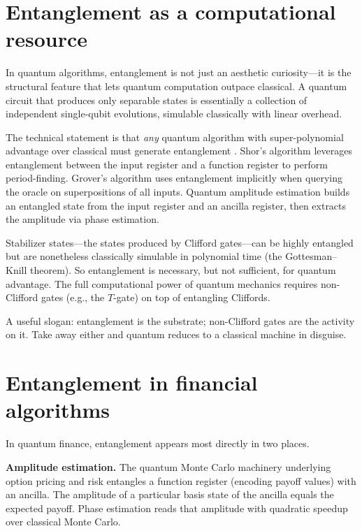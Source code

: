 \section{Entanglement as a computational resource}

In quantum algorithms, entanglement is not just an aesthetic curiosity---it is the structural feature that lets quantum computation outpace classical. A quantum circuit that produces only separable states is essentially a collection of independent single-qubit evolutions, simulable classically with linear overhead.

The technical statement is that \emph{any} quantum algorithm with super-polynomial advantage over classical must generate entanglement \citep{nielsen_quantum_2010}. Shor's algorithm leverages entanglement between the input register and a function register to perform period-finding. Grover's algorithm uses entanglement implicitly when querying the oracle on superpositions of all inputs. Quantum amplitude estimation builds an entangled state from the input register and an ancilla register, then extracts the amplitude via phase estimation.

Stabilizer states---the states produced by Clifford gates---can be highly entangled but are nonetheless classically simulable in polynomial time (the Gottesman--Knill theorem). So entanglement is necessary, but not sufficient, for quantum advantage. The full computational power of quantum mechanics requires non-Clifford gates (e.g., the $T$-gate) on top of entangling Cliffords.

\begin{remark}
A useful slogan: entanglement is the substrate; non-Clifford gates are the activity on it. Take away either and quantum reduces to a classical machine in disguise.
\end{remark}

\section{Entanglement in financial algorithms}

In quantum finance, entanglement appears most directly in two places.

\textbf{Amplitude estimation.} The quantum Monte Carlo machinery underlying option pricing and risk \citep{egger_quantum_2020,stamatopoulos_option_2020} entangles a function register (encoding payoff values) with an ancilla. The amplitude of a particular basis state of the ancilla equals the expected payoff. Phase estimation reads that amplitude with quadratic speedup over classical Monte Carlo.

